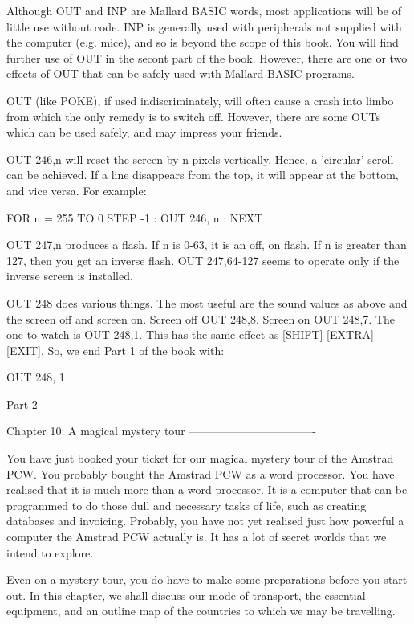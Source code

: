 Although  OUT  and INP are Mallard BASIC words, most applications will  be  of 
little  use without code. INP is generally used with peripherals not  supplied 
with  the computer (e.g. mice), and so is beyond the scope of this  book.  You 
will  find further use of OUT in the secont part of the book.  However,  there 
are  one  or  two effects of OUT that can be safely used  with  Mallard  BASIC 
programs.

OUT (like POKE), if used indiscriminately, will often cause a crash into limbo 
from  which  the only remedy is to switch off. However, there  are  some  OUTs 
which can be used safely, and may impress your friends.

OUT  246,n will reset the screen by n pixels vertically. Hence,  a  'circular' 
scroll  can be achieved. If a line disappears from the top, it will appear  at 
the bottom, and vice versa. For example:

        FOR n = 255 TO 0 STEP -1 : OUT 246, n : NEXT

OUT  247,n  produces a flash. If n is 0-63, it is an off, on flash.  If  n  is 
greater  than  127,  then you get an inverse flash. OUT  247,64-127  seems  to 
operate only if the inverse screen is installed.

OUT 248 does various things. The most useful are the sound values as above and 
the  screen off and screen on. Screen off OUT 248,8. Screen on OUT 248,7.  The 
one to watch is OUT 248,1. This has the same effect as [SHIFT] [EXTRA] [EXIT]. 
So, we end Part 1 of the book with:

        OUT 248, 1


Part 2
------

Chapter 10: A magical mystery tour
----------------------------------

You  have just booked your ticket for our magical mystery tour of the  Amstrad 
PCW.  You  probably  bought  the Amstrad PCW as a  word  processor.  You  have 
realised that it is much more than a word processor. It is a computer that can 
be  programmed to do those dull and necessary tasks of life, such as  creating 
databases and invoicing. Probably, you have not yet realised just how powerful 
a computer the Amstrad PCW actually is. It has a lot of secret worlds that  we 
intend to explore.

Even on a mystery tour, you do have to make some preparations before you start 
out.  In this chapter, we shall discuss our mode of transport,  the  essential 
equipment, and an outline map of the countries to which we may be travelling.


